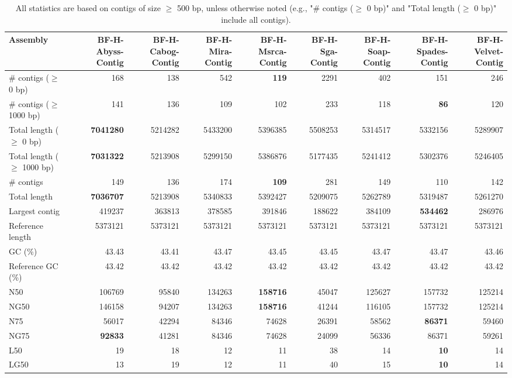 \documentclass[12pt,a4paper]{article}
\begin{document}
\begin{table}[ht]
\begin{center}
\caption{All statistics are based on contigs of size $\geq$ 500 bp, unless otherwise noted (e.g., "\# contigs ($\geq$ 0 bp)" and "Total length ($\geq$ 0 bp)" include all contigs).}
\begin{tabular}{|l*{8}{|r}|}
\hline
Assembly & BF-H-Abyss-Contig & BF-H-Cabog-Contig & BF-H-Mira-Contig & BF-H-Msrca-Contig & BF-H-Sga-Contig & BF-H-Soap-Contig & BF-H-Spades-Contig & BF-H-Velvet-Contig \\ \hline
\# contigs ($\geq$ 0 bp) & 168 & 138 & 542 & {\bf 119} & 2291 & 402 & 151 & 246 \\ \hline
\# contigs ($\geq$ 1000 bp) & 141 & 136 & 109 & 102 & 233 & 118 & {\bf 86} & 120 \\ \hline
Total length ($\geq$ 0 bp) & {\bf 7041280} & 5214282 & 5433200 & 5396385 & 5508253 & 5314517 & 5332156 & 5289907 \\ \hline
Total length ($\geq$ 1000 bp) & {\bf 7031322} & 5213908 & 5299150 & 5386876 & 5177435 & 5241412 & 5302376 & 5246405 \\ \hline
\# contigs & 149 & 136 & 174 & {\bf 109} & 281 & 149 & 110 & 142 \\ \hline
Total length & {\bf 7036707} & 5213908 & 5340833 & 5392427 & 5209075 & 5262789 & 5319487 & 5261270 \\ \hline
Largest contig & 419237 & 363813 & 378585 & 391846 & 188622 & 384109 & {\bf 534462} & 286976 \\ \hline
Reference length & 5373121 & 5373121 & 5373121 & 5373121 & 5373121 & 5373121 & 5373121 & 5373121 \\ \hline
GC (\%) & 43.43 & 43.41 & 43.47 & 43.45 & 43.45 & 43.47 & 43.47 & 43.46 \\ \hline
Reference GC (\%) & 43.42 & 43.42 & 43.42 & 43.42 & 43.42 & 43.42 & 43.42 & 43.42 \\ \hline
N50 & 106769 & 95840 & 134263 & {\bf 158716} & 45047 & 125627 & 157732 & 125214 \\ \hline
NG50 & 146158 & 94207 & 134263 & {\bf 158716} & 41244 & 116105 & 157732 & 125214 \\ \hline
N75 & 56017 & 42294 & 84346 & 74628 & 26391 & 58562 & {\bf 86371} & 59460 \\ \hline
NG75 & {\bf 92833} & 41281 & 84346 & 74628 & 24099 & 56336 & 86371 & 59261 \\ \hline
L50 & 19 & 18 & 12 & 11 & 38 & 14 & {\bf 10} & 14 \\ \hline
LG50 & 13 & 19 & 12 & 11 & 40 & 15 & {\bf 10} & 14 \\ \hline

\end{tabular}
\end{center}
\end{table}
\end{document}
